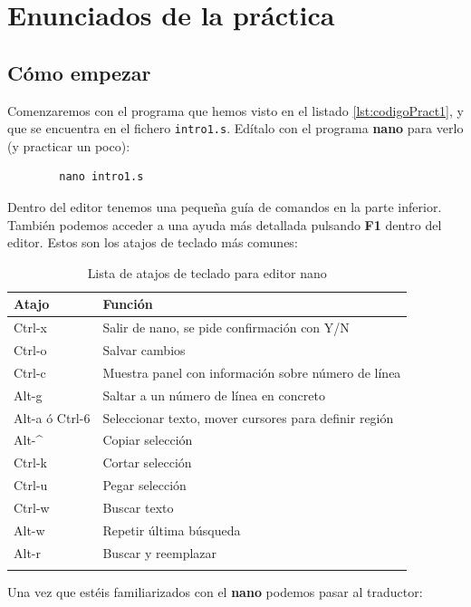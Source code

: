 \section{Enunciados de la práctica}

\subsection{Cómo empezar}

Comenzaremos con el programa que hemos visto en el listado
\ref{lst:codigoPract1}, y que se encuentra en el fichero {\tt intro1.s}.
Edítalo con el programa {\bf nano} para verlo (y practicar un poco):

\begin{lstlisting}
        nano intro1.s
\end{lstlisting}

Dentro del editor tenemos una pequeña guía de comandos en la parte
inferior. También podemos acceder a una ayuda más detallada pulsando {\bf F1}
dentro del editor. Estos son los atajos de teclado más comunes:

\begin{longtable}{| p{1.3cm} | p{12cm} |}
\hline
{\bf Atajo} & {\bf Función} \\ \hline
Ctrl-x & Salir de nano, se pide confirmación con Y/N \\ \hline
Ctrl-o & Salvar cambios \\ \hline
Ctrl-c & Muestra panel con información sobre número de línea \\ \hline
Alt-g  & Saltar a un número de línea en concreto \\ \hline
Alt-a ó\newline
Ctrl-6 & Seleccionar texto, mover cursores para definir región  \\ \hline
Alt-\^ & Copiar selección \\ \hline
Ctrl-k & Cortar selección \\ \hline
Ctrl-u & Pegar selección \\ \hline
Ctrl-w & Buscar texto \\ \hline
Alt-w  & Repetir última búsqueda \\ \hline
Alt-r  & Buscar y reemplazar \\ \hline
\caption{Lista de atajos de teclado para editor nano}
\label{list_nano}
\end{longtable}

Una vez que estéis familiarizados con el {\bf nano} podemos pasar al
traductor:

